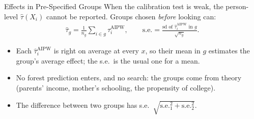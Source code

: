 \documentclass[aspectratio=169,11pt,xcolor=dvipsnames]{beamer}
\begin{document}
\begin{frame}{Effects in Pre-Specified Groups}
When the calibration test is weak, the person-level $\hat\tau(X_i)$ cannot be reported. Groups chosen
\emph{before} looking can:
\begin{align*}
  \hat\tau_g = \frac1{n_g}\sum_{i\in g}\hat\tau_i^{\text{AIPW}} ,
  \qquad \text{s.e.} = \frac{\text{sd of } \hat\tau_i^{\text{AIPW}} \text{ in } g}{\sqrt{n_g}} .
\end{align*}
\vskip-2pt
\begin{itemize}\itemsep4pt
  \item Each $\hat\tau_i^{\text{AIPW}}$ is right on average at every $x$, so their mean in $g$ estimates the group's
        average effect; the s.e.\ is the usual one for a mean.
  \item No forest prediction enters, and no search: the groups come from theory (parents' income,
        mother's schooling, the propensity of college).
  \item The difference between two groups has s.e.\ $\sqrt{\text{s.e.}_1^2 + \text{s.e.}_2^2}$.
\end{itemize}
\end{frame}
\end{document}
